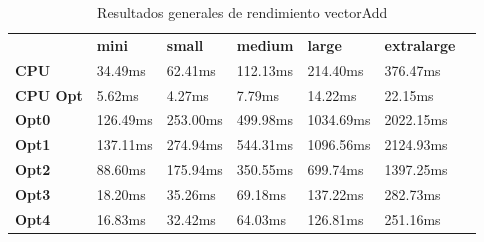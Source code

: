 \begin{table}[H]
    \centering
    \begin{tabular}{lllllll}
    \rowcolor[HTML]{DAE8FC} \ &  \textbf{mini} &  \textbf{small} &  \textbf{medium} &  \textbf{	large} &  \textbf{	extralarge} \\
    \cellcolor[HTML]{DAE8FC} \textbf{CPU} & 34.49ms & 62.41ms & 112.13ms & 	214.40ms & 	376.47ms \\
    \rowcolor[HTML]{EFEFEF} \cellcolor[HTML]{DAE8FC} \textbf{CPU Opt} & 5.62ms & 4.27ms & 7.79ms & 	14.22ms & 	22.15ms \\
    \cellcolor[HTML]{DAE8FC} \textbf{Opt0} & 126.49ms & 253.00ms & 499.98ms & 	1034.69ms & 	2022.15ms \\
    \rowcolor[HTML]{EFEFEF} \cellcolor[HTML]{DAE8FC} \textbf{Opt1} & 137.11ms & 274.94ms & 544.31ms & 	1096.56ms & 	2124.93ms \\
    \cellcolor[HTML]{DAE8FC} \textbf{Opt2} & 88.60ms & 175.94ms & 350.55ms & 	699.74ms & 	1397.25ms \\
    \rowcolor[HTML]{EFEFEF} \cellcolor[HTML]{DAE8FC} \textbf{Opt3} & 18.20ms & 35.26ms & 69.18ms & 	137.22ms & 	282.73ms \\
    \cellcolor[HTML]{DAE8FC} \textbf{Opt4} & 16.83ms & 32.42ms & 64.03ms & 	126.81ms & 	251.16ms \\
    \end{tabular}
    \caption[Resultados generales de rendimiento vectorAdd]{{Resultados generales de rendimiento vectorAdd}}
    \label{table_global_vectorAdd_PerformanceResults_data}
\end{table}